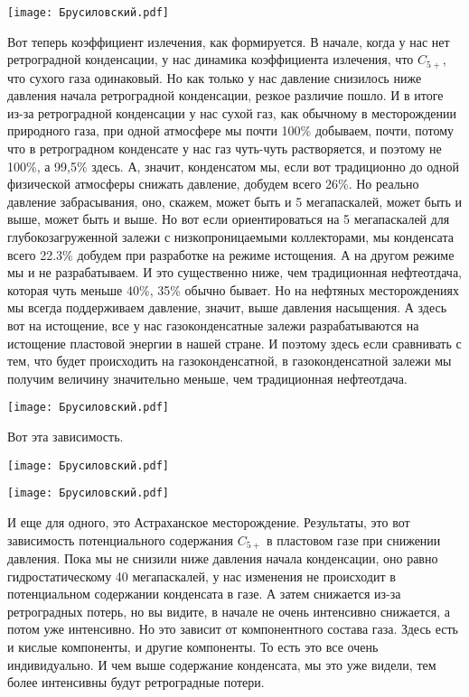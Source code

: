 \documentclass[main.tex]{subfiles}
\begin{document}
\begin{center}
\texttt{[image: Брусиловский.pdf]}
\end{center}

Вот теперь коэффициент излечения, как формируется.
В начале, когда у нас нет ретроградной конденсации, у нас динамика коэффициента излечения, что $C_{5+}$, что сухого газа одинаковый.
Но как только у нас давление снизилось ниже давления начала ретроградной конденсации, резкое различие пошло.
И в итоге из-за ретроградной конденсации у нас сухой газ, как обычному в месторождении природного газа, при одной атмосфере мы почти 100\% добываем, почти, потому что в ретроградном конденсате у нас газ чуть-чуть растворяется, и поэтому не 100\%, а 99,5\% здесь.
А, значит, конденсатом мы, если вот традиционно до одной физической атмосферы снижать давление, добудем всего 26\%.
Но реально давление забрасывания, оно, скажем, может быть и 5 мегапаскалей, может быть и выше, может быть и выше.
Но вот если ориентироваться на 5 мегапаскалей для глубокозагруженной залежи с низкопроницаемыми коллекторами, мы конденсата всего 22.3\% добудем при разработке на режиме истощения.
А на другом режиме мы и не разрабатываем.
И это существенно ниже, чем традиционная нефтеотдача, которая чуть меньше 40\%, 35\% обычно бывает.
Но на нефтяных месторождениях мы всегда поддерживаем давление, значит, выше давления насыщения.
А здесь вот на истощение, все у нас газоконденсатные залежи разрабатываются на истощение пластовой энергии в нашей стране.
И поэтому здесь если сравнивать с тем, что будет происходить на газоконденсатной, в газоконденсатной залежи мы получим величину значительно меньше, чем традиционная нефтеотдача.

\begin{center}
\texttt{[image: Брусиловский.pdf]}
\end{center}

Вот эта зависимость.

\begin{center}
\texttt{[image: Брусиловский.pdf]}
\end{center}



\begin{center}
\texttt{[image: Брусиловский.pdf]}
\end{center}

И еще для одного, это Астраханское месторождение.
Результаты, это вот зависимость потенциального содержания $C_{5+}$ в пластовом газе при снижении давления.
Пока мы не снизили ниже давления начала конденсации, оно равно гидростатическому 40 мегапаскалей, у нас изменения не происходит в потенциальном содержании конденсата в газе.
А затем снижается из-за ретроградных потерь, но вы видите, в начале не очень интенсивно снижается, а потом уже интенсивно.
Но это зависит от компонентного состава газа.
Здесь есть и кислые компоненты, и другие компоненты.
То есть это все очень индивидуально.
И чем выше содержание конденсата, мы это уже видели, тем более интенсивны будут ретроградные потери.
\end{document}
